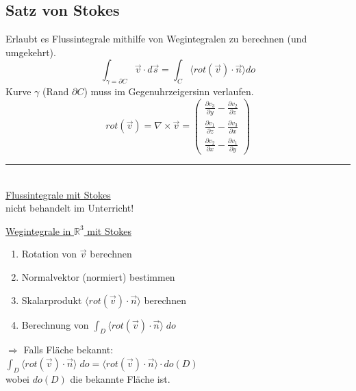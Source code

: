 \documentclass[6pt]{article}
\begin{document}
\begin{multicols*}{3}
		\vspace{15mm}
		\quad
		



		\columnbreak
		\subsection*{Satz von Stokes}
		Erlaubt es Flussintegrale mithilfe von Wegintegralen zu berechnen (und umgekehrt).
		\[
			\int_{\gamma = \partial C} \vec{v} \cdot d\vec{s} = \int_C \langle rot(\vec{v}) \cdot \vec{n} \rangle do
		\]
		Kurve $\gamma$ (Rand $\partial C$) muss im Gegenuhrzeigersinn verlaufen.
		\[
				rot(\vec{v}) = \nabla \times \vec{v} = 
				\begin{pmatrix} 
					\frac{\partial v_3}{\partial y} - \frac{\partial v_2}{\partial z} \\
					\frac{\partial v_1}{\partial z} - \frac{\partial v_3}{\partial x} \\
					\frac{\partial v_2}{\partial x} - \frac{\partial v_1}{\partial y} 
				\end{pmatrix}
		\]
		
	\vspace{-2mm}
  	\noindent\textcolor{gray}{\rule{9cm}{0.1pt}}
	\vspace{-2mm}\\
		
		\underline{Flussintegrale mit Stokes} \vspace{1mm} \\
		
				nicht behandelt im Unterricht!
				
				\vspace{5mm}
		
		
		\underline{Wegintegrale in $\mathbb{R}^3$ mit Stokes} \vspace{1mm} \\
				\vspace{-10mm} 	
		\begin{enumerate}[label=(\roman*), itemsep=2pt, parsep=2pt]
			\item Rotation von $\vec{v}$ berechnen
			\item Normalvektor (normiert) bestimmen
			\item Skalarprodukt $\langle rot(\vec{v}) \cdot \vec{n} \rangle$ berechnen
			\item Berechnung von  $\int_D \langle rot(\vec{v}) \cdot \vec{n} \rangle \; do$ 
		\end{enumerate}
		
		\vspace{5mm} 		
		$\Rightarrow$ Falls Fl{\"a}che bekannt:\vspace{3mm} \\
		$\int_D \langle rot(\vec{v}) \cdot \vec{n} \rangle \; do = \langle rot(\vec{v}) \cdot \vec{n} \rangle \cdot do(D)$ \vspace{2mm} \\
		wobei $do(D)$ die bekannte Fl{\"a}che ist.
		

\end{multicols*}
\end{document}
